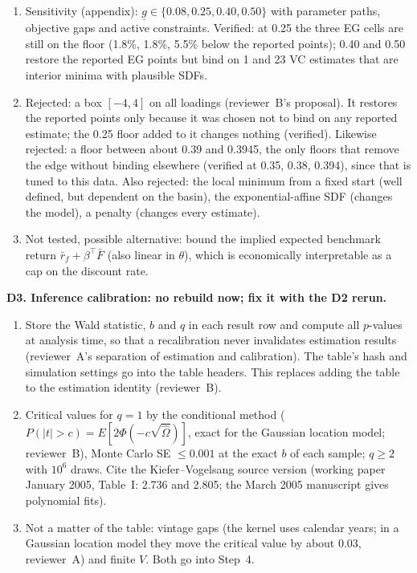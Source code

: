 \documentclass[11pt]{article}
\begin{document}
\begin{enumerate}
\item Sensitivity (appendix): $\underline g\in\{0.08, 0.25, 0.40, 0.50\}$ with parameter paths, objective gaps and active constraints. Verified: at 0.25 the three EG cells are still on the floor (1.8\%, 1.8\%, 5.5\% below the reported points); 0.40 and 0.50 restore the reported EG points but bind on 1 and 23 VC estimates that are interior minima with plausible SDFs.
\item Rejected: a box $[-4,4]$ on all loadings (reviewer~B's proposal). It restores the reported points only because it was chosen not to bind on any reported estimate; the 0.25 floor added to it changes nothing (verified). Likewise rejected: a floor between about 0.39 and 0.3945, the only floors that remove the edge without binding elsewhere (verified at 0.35, 0.38, 0.394), since that is tuned to this data. Also rejected: the local minimum from a fixed start (well defined, but dependent on the basin), the exponential-affine SDF (changes the model), a penalty (changes every estimate).
\item Not tested, possible alternative: bound the implied expected benchmark return $\bar r_f+\beta^\top\bar F$ (also linear in $\theta$), which is economically interpretable as a cap on the discount rate.
\end{enumerate}

\textbf{D3. Inference calibration: no rebuild now; fix it with the D2 rerun.}
\begin{enumerate}
\item Store the Wald statistic, $b$ and $q$ in each result row and compute all $p$-values at analysis time, so that a recalibration never invalidates estimation results (reviewer~A's separation of estimation and calibration). The table's hash and simulation settings go into the table headers. This replaces adding the table to the estimation identity (reviewer~B).
\item Critical values for $q=1$ by the conditional method ($P(|t|>c)=E[2\Phi(-c\sqrt{\widehat\Omega})]$, exact for the Gaussian location model; reviewer~B), Monte Carlo SE $\le0.001$ at the exact $b$ of each sample; $q\ge2$ with $10^6$ draws. Cite the Kiefer--Vogelsang source version (working paper January 2005, Table~I: 2.736 and 2.805; the March 2005 manuscript gives polynomial fits).
\item Not a matter of the table: vintage gaps (the kernel uses calendar years; in a Gaussian location model they move the critical value by about 0.03, reviewer~A) and finite $V$. Both go into Step~4.
\end{enumerate}
\end{document}
